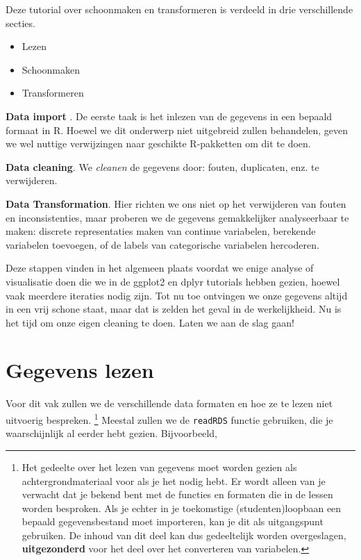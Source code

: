 \documentclass[]{tufte-book}
\providecommand{\tightlist}{%
  \setlength{\itemsep}{0pt}\setlength{\parskip}{0pt}}
\begin{document}
Deze tutorial over schoonmaken en transformeren is verdeeld in drie verschillende secties.

\begin{itemize}
\tightlist
\item
  Lezen
\item
  Schoonmaken
\item
  Transformeren
\end{itemize}

\textbf{Data import }. De eerste taak is het inlezen van de gegevens in een bepaald formaat in R. Hoewel we dit onderwerp niet uitgebreid zullen behandelen, geven we wel nuttige verwijzingen naar geschikte R-pakketten om dit te doen.

\textbf{Data cleaning}. We \emph{cleanen} de gegevens door: fouten, duplicaten, enz. te verwijderen.

\textbf{Data Transformation}. Hier richten we ons niet op het verwijderen van fouten en inconsistenties, maar proberen we de gegevens gemakkelijker analyseerbaar te maken: discrete representaties maken van continue variabelen, berekende variabelen toevoegen, of de labels van categorische variabelen hercoderen.

Deze stappen vinden in het algemeen plaats voordat we enige analyse of visualisatie doen die we in de ggplot2 en dplyr tutorials hebben gezien, hoewel vaak meerdere iteraties nodig zijn. Tot nu toe ontvingen we onze gegevens altijd in een vrij schone staat, maar dat is zelden het geval in de werkelijkheid. Nu is het tijd om onze eigen cleaning te doen. Laten we aan de slag gaan!

\hypertarget{gegevens-lezen}{%
\section{Gegevens lezen}\label{gegevens-lezen}}

Voor dit vak zullen we de verschillende data formaten en hoe ze te lezen niet uitvoerig bespreken. \footnote{Het gedeelte over het lezen van gegevens moet worden gezien als achtergrondmateriaal voor als je het nodig hebt. Er wordt alleen van je verwacht dat je bekend bent met de functies en formaten die in de lessen worden besproken. Als je echter in je toekomstige (studenten)loopbaan een bepaald gegevensbestand moet importeren, kan je dit als uitgangspunt gebruiken. De inhoud van dit deel kan dus gedeeltelijk worden overgeslagen, \textbf{uitgezonderd} voor het deel over het converteren van variabelen.} Meestal zullen we de \texttt{readRDS} functie gebruiken, die je waarschijnlijk al eerder hebt gezien. Bijvoorbeeld,
\end{document}
